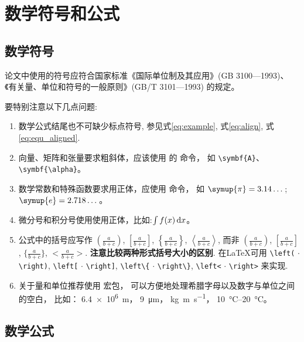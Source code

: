 
\chapter{数学符号和公式}\label{equations}

\section{数学符号}

论文中使用的符号应符合国家标准《国际单位制及其应用》(GB 3100—1993)、《有关量、单位和符号的一般原则》(GB/T 3101—1993) 的规定。

要特别注意以下几点问题:

\begin{enumerate}
\item 数学公式结尾也不可缺少标点符号, 参见式\eqref{eq:example}, 式\eqref{eq:align}, 式\eqref{eq:equ_aligned}.
    \item 向量、矩阵和张量要求粗斜体，应该使用  的  命令，
          如 \verb|\symbf{A}|、\verb|\symbf{\alpha}|。
    \item 数学常数和特殊函数要求用正体，应使用  命令，
    如 $\symup{\pi} = 3.14\dots$; $\symup{e} = 2.718\dots$。
    \item 微分号和积分号使用使用正体，比如:$\int f(x) \mathop{}\!\mathrm{d} x$。
    \item 公式中的括号应写作 $\displaystyle \left(\frac{a}{b + c}\right)$, $\displaystyle \left[\frac{a}{b + c}\right]$, $\displaystyle \left\{\frac{a}{b + c}\right\}$, $\displaystyle \left<\frac{a}{b + c}\right>$, 而非 $\displaystyle (\frac{a}{b + c})$, $\displaystyle [\frac{a}{b + c}]$, $\displaystyle \{\frac{a}{b + c}\}$, $\displaystyle <\frac{a}{b + c}>$.
    \textbf{注意比较两种形式括号大小的区别}. 在\LaTeX{}可用 \verb|\left(| $\cdot$ \verb|\right)|, \verb|\left[| $\cdot$ \verb|\right]|, \verb|\left\{| $\cdot$ \verb|\right\}|, \verb|\left<| $\cdot$ \verb|\right>| 来实现.
    \item 关于量和单位推荐使用\href{http://mirrors.ctan.org/macros/latex/contrib/siunitx/siunitx.pdf}{}
宏包，
        可以方便地处理希腊字母以及数字与单位之间的空白，
        比如：
        \SI{6.4e6}{m}，
        \SI{9}{\micro\meter}，
        \si{kg.m.s^{-1}}，
        \SIrange{10}{20}{\degreeCelsius}。
\end{enumerate}

\section{数学公式}

